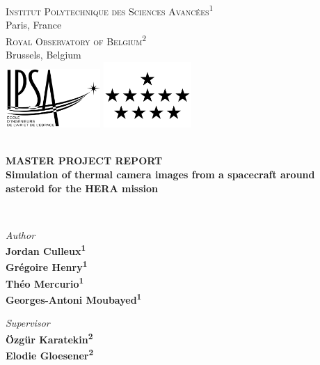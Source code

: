 \begin{titlepage}
    \vspace*{2cm}
    \centering
    \textsc{\large
    Institut Polytechnique des Sciences Avancées\textsuperscript{1}\\
    }
    Paris, France\\[0.5cm]
    \textsc{\large
    Royal Observatory of Belgium\textsuperscript{2}\\
    }
    Brussels, Belgium\\[0.5cm]
    \includegraphics[width=0.27\textwidth]{../rsc/ipsa.png}
    \hspace{1cm}
    \includegraphics[width=0.25\textwidth]{../rsc/rob.png}\\[1cm]

    \linespread{1}
    \HRule \\[0.3cm]
    {\Large\bfseries
    MASTER PROJECT REPORT\\
    Simulation of thermal camera images from a spacecraft around asteroid for the HERA mission
    \par}
    \vspace*{0.3cm}
    \HRule \\[2cm]

    \begin{minipage}[t]{0.4\textwidth}
        \begin{flushleft} \large
            \emph{Author}\\\bfseries
            Jordan Culleux\textsuperscript{1}\\
            Grégoire Henry\textsuperscript{1}\\
            Théo Mercurio\textsuperscript{1}\\
            Georges-Antoni Moubayed\textsuperscript{1}
        \end{flushleft}
    \end{minipage}
    \begin{minipage}[t]{0.4\textwidth}
        \begin{flushright} \large
            \emph{Supervisor}\\\bfseries
            Özgür Karatekin\textsuperscript{2}\\
            Elodie Gloesener\textsuperscript{2}
        \end{flushright}
    \end{minipage}


\end{titlepage}
